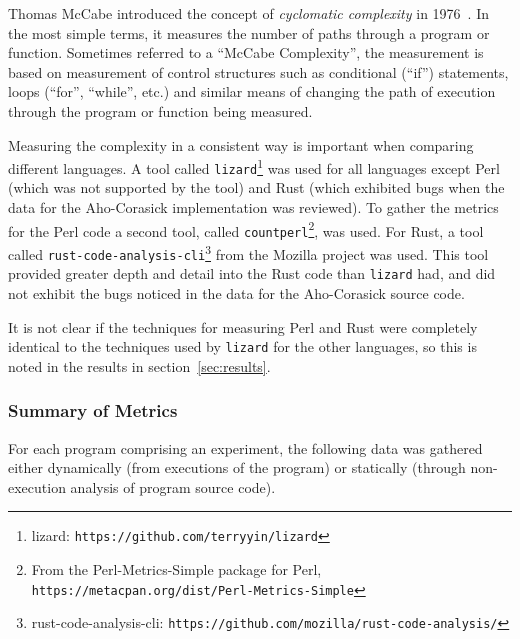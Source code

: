 Thomas McCabe introduced the concept of \textit{cyclomatic complexity} in 1976~\cite{mccabe}. In the most simple terms, it measures the number of paths through a program or function. Sometimes referred to a ``McCabe Complexity'', the measurement is based on measurement of control structures such as conditional (``if'') statements, loops (``for'', ``while'', etc.) and similar means of changing the path of execution through the program or function being measured.

Measuring the complexity in a consistent way is important when comparing different languages. A tool called \texttt{lizard}\footnote{lizard: \texttt{https://github.com/terryyin/lizard}} was used for all languages except Perl (which was not supported by the tool) and Rust (which exhibited bugs when the data for the Aho-Corasick implementation was reviewed). To gather the metrics for the Perl code a second tool, called \texttt{countperl}\footnote{From the Perl-Metrics-Simple package for Perl, \texttt{https://metacpan.org/dist/Perl-Metrics-Simple}}, was used. For Rust, a tool called \texttt{rust-code-analysis-cli}\footnote{rust-code-analysis-cli: \texttt{https://github.com/mozilla/rust-code-analysis/}} from the Mozilla project was used. This tool provided greater depth and detail into the Rust code than \texttt{lizard} had, and did not exhibit the bugs noticed in the data for the Aho-Corasick source code.

It is not clear if the techniques for measuring Perl and Rust were completely identical to the techniques used by \texttt{lizard} for the other languages, so this is noted in the results in section~\ref{sec:results}.

\subsubsection{Summary of Metrics}

For each program comprising an experiment, the following data was gathered either dynamically (from executions of the program) or statically (through non-execution analysis of program source code).

